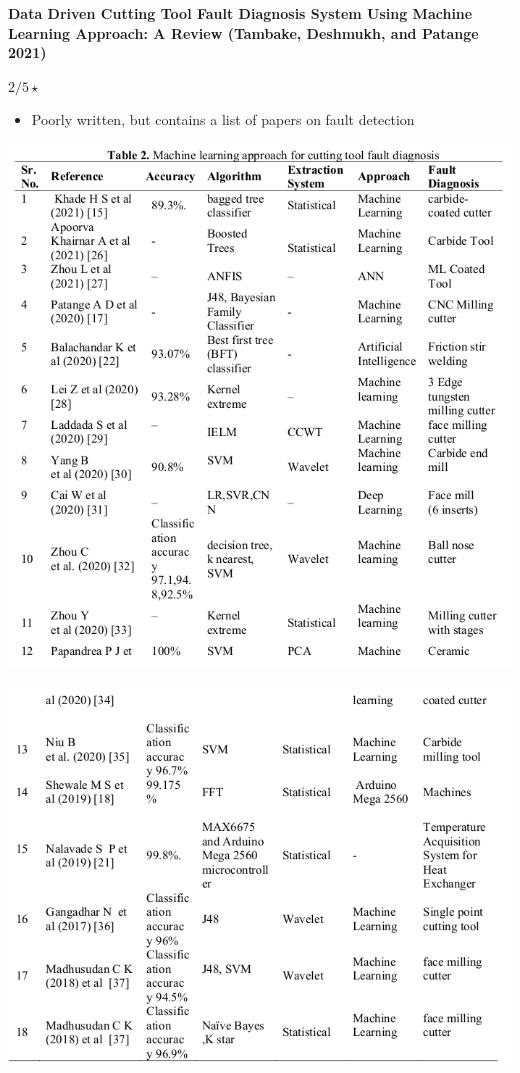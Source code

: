 \documentclass[
  letterpaper,
  DIV=11,
  numbers=noendperiod]{scrartcl}
\providecommand{\tightlist}{%
  \setlength{\itemsep}{0pt}\setlength{\parskip}{0pt}}\usepackage{longtable,booktabs,array}
\begin{document}
\textbf{Data Driven Cutting Tool Fault Diagnosis System Using Machine
Learning Approach: A Review (Tambake, Deshmukh, and Patange 2021)}

\(2/5 \star\)

\begin{itemize}
\tightlist
\item
  Poorly written, but contains a list of papers on fault detection
\end{itemize}

\includegraphics{img/2023-01-07-12-19-30.png}

\includegraphics{img/2023-01-07-12-20-27.png}
\end{document}
